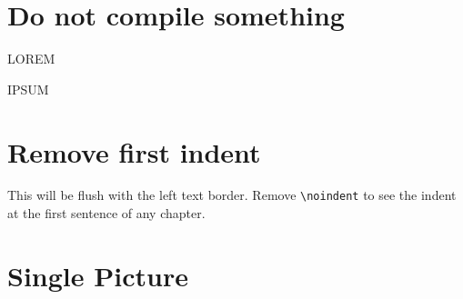 
\chapter{Do not compile something}

LOREM

IPSUM

\chapter{Remove first indent}

\noindent This will be flush with the left text border. Remove
\verb|\noindent| to see the indent at the first sentence of any chapter.

\chapter{Single Picture}

